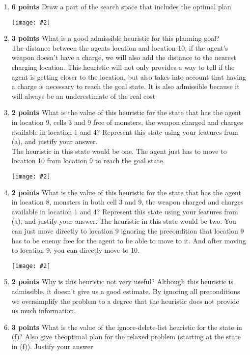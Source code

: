 \documentclass{article}
\def\ans#1{{\color{ans}#1}}
\newcommand{\centerfig}[2]{\begin{center}\texttt{[image: \#2]}\end{center}}
\begin{document}
\begin{enumerate}[label=(\alph*)]
    \item \textbf{6 points} Draw a part of the search space that includes the optimal plan
    \centerfig{0.5}{../figs/1-c.png}
    \item \textbf{3 points} What is a good admissible heuristic for this planning goal? \\
    \ans{
        The distance between the agents location and location 10, if the agent's weapon doesn't 
        have a charge, we will also add the distance to the nearest charging location. This heuristic 
        will not only provides a way to tell if the agent is getting closer to the location, but also 
        takes into account that having a charge is necessary to reach the goal state. It is also 
        admissible because it will always be an underestimate of the real cost
    }
    \item \textbf{2 points} What is the value of this heuristic for the state that has the agent in 
    location 9, cells 3 and 9 free of monsters, the weapon charged and charges available in location 1 and 4? Represent this state using
    your features from (a), and justify your answer. \\ 
    \ans{
        The heuristic in this state would be one. The agent just has to move to location 10 from 
        location 9 to reach the goal state.
    }  \\
    \centerfig{0.1}{../figs/1-e.png} 
    \item \textbf{2 points} What is the value of this heuristic for the state that has the agent in 
    location 8, monsters in both cell 3 and 9, the weapon charged and charges available in location 1 and 4? 
    Represent this state using your features from (a), and justify your answer.
    \ans{
        The heuristic in this state would be two. You can just move directly to location 9 ignoring 
        the precondition that location 9 has to be enemy free for the agent to be able to move to it. 
        And after moving to location 9, you can directly move to 10.
    }  \\
	\centerfig{0.1}{../figs/1-f.png} 
    \item \textbf{2 points} Why is this heuristic not very useful?
    \ans{
        Although this heuristic is admissible, it doesn't give us a good estimate. By ignoring all preconditions we oversimplify the problem to a degree that the heuristic does not provide us much information.
    }  \\
    \item \textbf{3 points} What is the value of the ignore-delete-list heuristic for the state in (f)? Also give theoptimal plan for the relaxed problem (starting at the state in (f)). Justify your answer

\end{enumerate}
\end{document}
